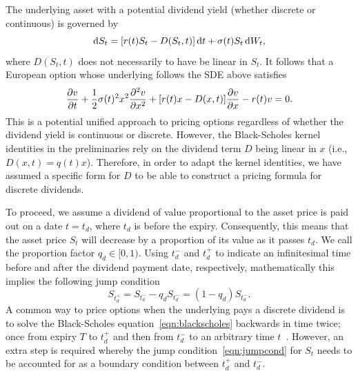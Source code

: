 The underlying asset with a potential dividend yield (whether discrete or continuous) is governed by~\cite{Wilmott1995}
	\begin{equation*}
		\mathrm d S_t = [r(t)S_t - D(S_t,t)] \, \mathrm d t + \sigma(t) S_t  \, \mathrm d W_t,
	\end{equation*}
where $D(S_t,t)$ does not necessarily to have be linear in $S_t$. It follows that a European option whose underlying follows the SDE above satisfies
	\begin{equation*}
		\frac{\partial v}{\partial t} + \frac{1}{2}\sigma(t)^2x^2\frac{\partial^2 v}{\partial x^2} + [r(t)x - D(x,t)]\frac{\partial v}{\partial x} - r(t)v = 0.
	\end{equation*}
This is a potential unified approach to pricing options regardless of whether the dividend yield is continuous or discrete. However, the Black-Scholes kernel identities in the preliminaries rely on the dividend term $D$ being linear in $x$ (i.e., $D(x,t) = q(t)x$). Therefore, in order to adapt the kernel identities, we have assumed a specific form for $D$ to be able to construct a pricing formula for discrete dividends.

To proceed, we assume a dividend of value proportional to the asset price is paid out on a date $t = t_d$, where $t_d$ is before the expiry. Consequently, this means that the asset price $S_t$ will decrease by a proportion of its value as it passes $t_d$. We call the proportion factor $q_d \in [0,1)$. Using $t_d^-$ and $t_d^+$ to indicate an infinitesimal time before and after the dividend payment date, respectively, mathematically this implies the following jump condition
	\begin{equation}
		\label{eqn:jumpcond}
		S_{t_d^+} = S_{t_d^-} - q_dS_{t_d^-} = (1-q_d)S_{t_d^-}.
	\end{equation}
A common way to price options when the underlying pays a discrete dividend is to solve the Black-Scholes equation~\eqref{eqn:blackscholes} backwards in time twice; once from expiry $T$ to $t_d^+$ and then from $t_d^-$ to an arbitrary time $t$~\cite{Wilmott1995, Jiang2005}. However, an extra step is required whereby the jump condition~\eqref{eqn:jumpcond} for $S_t$ needs to be accounted for as a boundary condition between $t_d^+$ and $t_d^-$.


